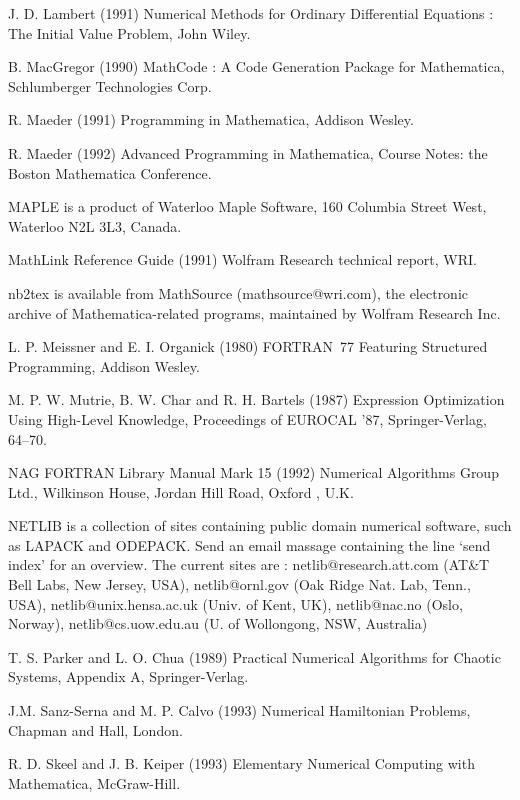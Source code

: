 \documentclass [12pt,twoside]{article}
\begin{document}
\begin{thebibliography}{999}
 J. D. Lambert (1991) Numerical Methods for Ordinary
Differential Equations : The Initial Value Problem, John Wiley.

 B. MacGregor (1990) MathCode : A Code Generation
Package for Mathematica, Schlumberger Technologies Corp.

 R. Maeder (1991) Programming in Mathematica,
Addison Wesley.

 R. Maeder (1992) Advanced Programming in
Mathematica, Course Notes: the Boston Mathematica Conference.

 MAPLE is a product of Waterloo Maple Software, 160
Columbia Street West, Waterloo N2L 3L3, Canada.

 MathLink Reference Guide (1991) Wolfram Research
technical report, WRI.

 nb2tex is available from MathSource (mathsource@wri.com),
the electronic archive of Mathematica-related programs, maintained by Wolfram
Research Inc.

 L. P. Meissner and E. I. Organick (1980) FORTRAN~77
Featuring Structured Programming, Addison Wesley.

 M. P. W. Mutrie, B. W. Char and R. H. Bartels (1987)
Expression Optimization Using High-Level Knowledge, Proceedings of 
EUROCAL '87, Springer-Verlag, 64--70.

 NAG FORTRAN Library Manual Mark 15 (1992) Numerical
Algorithms Group Ltd., Wilkinson House, Jordan Hill Road, Oxford , U.K.

 NETLIB is a collection of sites containing public
domain numerical software, such as LAPACK and ODEPACK. Send an email
massage containing the line `send index' for an overview. The current
sites are : netlib@research.att.com (AT\&T Bell Labs, New Jersey, USA),
netlib@ornl.gov (Oak Ridge Nat. Lab, Tenn., USA),
netlib@unix.hensa.ac.uk (Univ. of Kent, UK), netlib@nac.no (Oslo,
Norway), netlib@cs.uow.edu.au (U. of Wollongong, NSW, Australia)

 T. S. Parker and L. O. Chua (1989) Practical Numerical
Algorithms for Chaotic Systems, Appendix A, Springer-Verlag.

 J.M. Sanz-Serna and M. P. Calvo (1993)
Numerical Hamiltonian Problems,
Chapman and Hall, London.

 R. D. Skeel and J. B. Keiper (1993) Elementary
Numerical Computing with Mathematica, McGraw-Hill.


\end{thebibliography}
\end{document}
